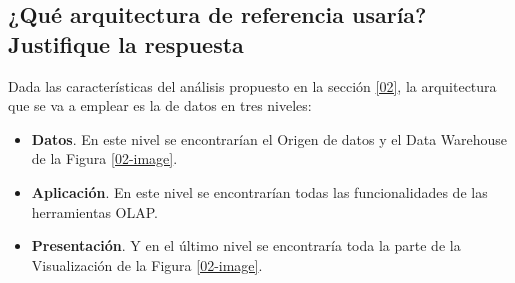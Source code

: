 \medskip
\subsection{¿Qué arquitectura de referencia usaría? Justifique la respuesta}
Dada las características del análisis propuesto en la sección \ref{02}, la arquitectura que se va a emplear es la de datos en tres niveles:
\begin{itemize}
 \item \textbf{Datos}. En este nivel se encontrarían el Origen de datos y el Data Warehouse de la Figura \ref{02-image}.
 \item \textbf{Aplicación}. En este nivel se encontrarían todas las funcionalidades de las herramientas OLAP.
 \item \textbf{Presentación}. Y en el último nivel se encontraría toda la parte de la Visualización de la Figura \ref{02-image}.
\end{itemize}
